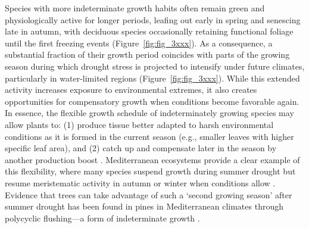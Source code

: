 \documentclass{article}
\begin{document}

Species with more indeterminate growth habits often remain green and physiologically active for longer periods, leafing out early in spring and senescing late in autumn, with deciduous species occasionally retaining functional foliage until the first freezing events (Figure~\ref{fig:fig_3xxx}). As a consequence, a substantial fraction of their growth period coincides with parts of the growing season during which drought stress is projected to intensify under future climates, particularly in water-limited regions (Figure~\ref{fig:fig_3xxx}). While this extended activity increases exposure to environmental extremes, it also creates opportunities for compensatory growth when conditions become favorable again.\\

In essence, the flexible growth schedule of indeterminately growing species may allow plants to: (1) produce tissue better adapted to harsh environmental conditions as it is formed in the current season (e.g., smaller leaves with higher specific leaf area), and (2) catch up and compensate later in the season by another production boost \citep{stevensInducedResistanceIndeterminate2005}. Mediterranean ecosystems provide a clear example of this flexibility, where many species suspend growth during summer drought but resume meristematic activity in autumn or winter when conditions allow \citep{volaireSeasonallyReducedGrowth2023a}. Evidence that trees can take advantage of such a `second growing season' after summer drought has been found in pines in Mediterranean climates through polycyclic flushing—a form of indeterminate growth \citep[Figure~\ref{fig:fig_3xxx},]{girardPolycyclismFundamentalTree2011}.\\
\end{document}
